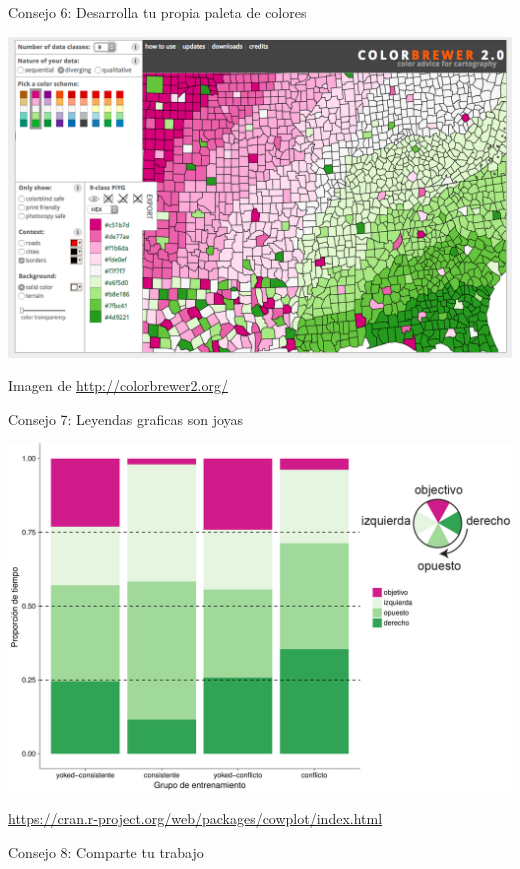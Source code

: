 \begin{frame}{Consejo 6: Desarrolla tu propia paleta de colores}

\includegraphics{../figures/talk/colorbrewer.png}

Imagen de \url{http://colorbrewer2.org/}

\end{frame}

\begin{frame}{Consejo 7: Leyendas graficas son joyas}

\includegraphics{../figures/talk/timespent-1.pdf}

\url{https://cran.r-project.org/web/packages/cowplot/index.html}

\end{frame}

\begin{frame}{Consejo 8: Comparte tu trabajo}

\end{frame}

